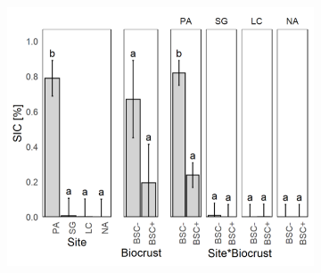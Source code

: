 \begin{figure}[htbp]
\begin{subfigure}[b]{0.32\textwidth}
        \centering
        \includegraphics[width=\linewidth]{img/M1-Figure_2-06.png}
    \end{subfigure}

    \vspace{0.3cm}


\end{figure}
